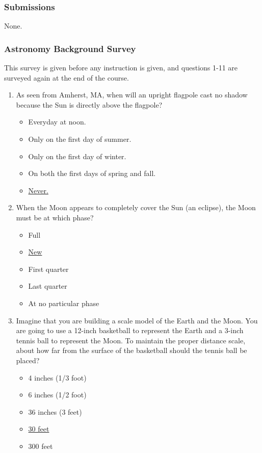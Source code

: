 \documentclass[12pt]{article}
\begin{document}
\subsubsection{Submissions}
None.

\subsubsection{Astronomy Background Survey}
This survey is given before any instruction is given, and questions 1-11 are surveyed again at the end of the course.
\begin{enumerate}
\item
As seen from Amherst, MA, when will an upright flagpole cast no shadow because the Sun is directly above the flagpole?
\begin{itemize}
    \item Everyday at noon.
    \item Only on the first day of summer.
    \item Only on the first day of winter.
    \item On both the first days of spring and fall.
    \item \underline{Never.}
\end{itemize}
\item
When the Moon appears to completely cover the Sun (an eclipse), the Moon must be at which phase?
\begin{itemize}
    \item Full
    \item \underline{New}
    \item First quarter
    \item Last quarter
    \item At no particular phase
\end{itemize}
\item
Imagine that you are building a scale model of the Earth and the Moon. You are going to use a 12-inch basketball to represent the Earth and a 3-inch tennis ball to represent the Moon. To maintain the proper distance scale, about how far from the surface of the basketball should the tennis ball be placed?
\begin{itemize}
    \item 4 inches (1/3 foot)
    \item 6 inches (1/2 foot)
    \item 36 inches (3 feet)
    \item \underline{30 feet}
    \item 300 feet

\end{itemize}
\end{enumerate}
\end{document}
